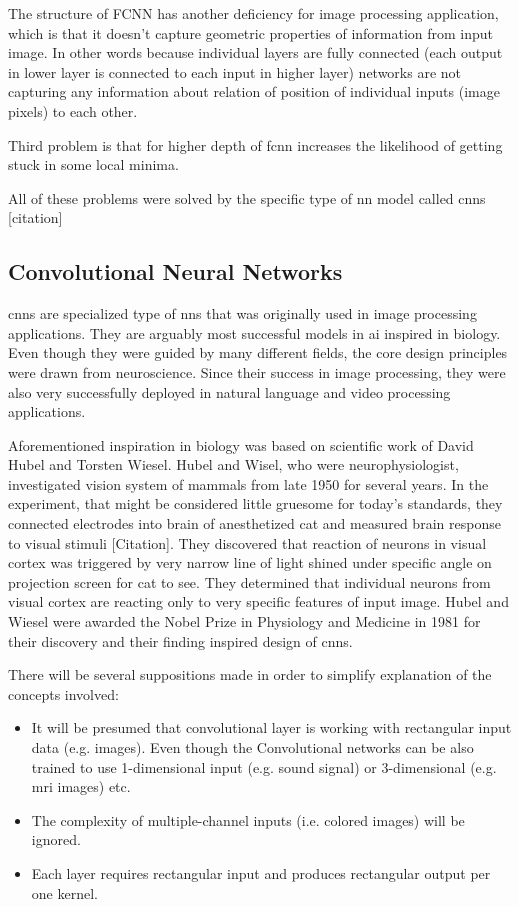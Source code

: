 \documentclass[11pt]{article}
\begin{document}
The structure of FCNN has another deficiency for image processing application, which is that it doesn't capture geometric properties of information from input image. In other words because individual layers are fully connected (each output in lower layer is connected to each input in higher layer) networks are not capturing any information about relation of position of individual inputs (image pixels) to each other.

Third problem is that for higher depth of \gls{fcnn} increases the likelihood of getting stuck in some local minima.

All of these problems were solved by the specific type of \gls{nn} model called \glspl{cnn} [citation]
\subsection{Convolutional Neural Networks}
\label{sec:orgb7a77ed}
\glspl{cnn} are specialized type of \glspl{nn} that was originally used in image processing applications. They are arguably most successful models in \gls{ai} inspired in biology. Even though they were guided by many different fields, the core design principles were drawn from neuroscience. Since their success in image processing, they were also very successfully deployed in natural language and video processing applications.

Aforementioned inspiration in biology was based on scientific work of David Hubel and Torsten Wiesel. Hubel and Wisel, who were neurophysiologist, investigated vision system of mammals from late 1950 for several years. In the experiment, that might be considered little gruesome for today's standards, they connected electrodes into brain of anesthetized cat and measured brain response to visual stimuli [Citation]. They discovered that reaction of neurons in visual cortex was triggered by very narrow line of light shined under specific angle on projection screen for cat to see. They determined that individual neurons from visual cortex are reacting only to very specific features of input image. Hubel and Wiesel were awarded the Nobel Prize in Physiology and Medicine in 1981 for their discovery and their finding inspired design of \glspl{cnn}.

There will be several suppositions made in order to simplify explanation of the concepts involved:
\begin{itemize}
\item It will be presumed that convolutional layer is working with rectangular input data (e.g. images). Even though the Convolutional networks can be also trained to use 1-dimensional input (e.g. sound signal) or 3-dimensional (e.g. \gls{mri} images) etc.
\item The complexity of multiple-channel inputs (i.e. colored images) will be ignored.
\item Each layer requires rectangular input and produces rectangular output per one kernel.
\end{itemize}
\end{document}
